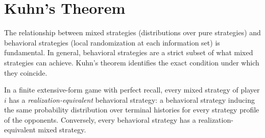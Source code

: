 \documentclass[11pt,a4paper]{article}
\begin{document}

\section{Kuhn's Theorem}
\label{sec:kuhn}

The relationship between mixed strategies (distributions over pure strategies)
and behavioral strategies (local randomization at each information set) is
fundamental. In general, behavioral strategies are a strict subset of what
mixed strategies can achieve. Kuhn's theorem identifies the exact condition
under which they coincide.

\begin{keyresult}
\begin{theorem}[Kuhn, 1953]
\label{thm:kuhn}
In a finite extensive-form game with perfect recall, every mixed strategy of
player $i$ has a \emph{realization-equivalent} behavioral strategy: a
behavioral strategy inducing the same probability distribution over terminal
histories for every strategy profile of the opponents. Conversely, every
behavioral strategy has a realization-equivalent mixed strategy.
\end{theorem}
\end{keyresult}
\end{document}
